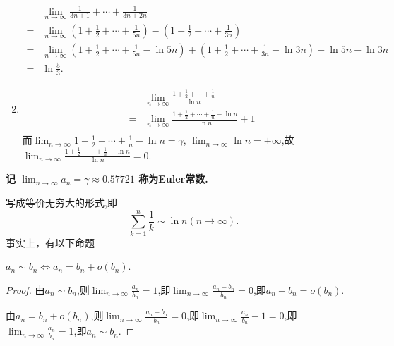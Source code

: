 \begin{example}
\begin{solution}
\begin{enumerate}
                  \begin{align*}
                        & \lim_{n \to \infty} \frac{1}{3n+1} + \cdots + \frac{1}{3n+2n}                                                                                               \\
                      = & \lim_{n \to \infty} \left( 1 + \frac12 + \cdots + \frac1{5n} \right) - \left( 1 + \frac12 + \cdots + \frac1{3n} \right)                                     \\
                      = & \lim_{n \to \infty} \left( 1 + \frac12 + \cdots + \frac1{5n} - \ln 5n \right) + \left( 1 + \frac12 + \cdots + \frac1{3n} - \ln 3n \right) + \ln 5n - \ln 3n \\
                      = & \ln \frac53.
                  \end{align*}
            \item
                  \begin{align*}
                        & \lim_{n \to \infty} \frac{ 1 + \frac12 + \cdots + \frac1n}{\ln n}             \\
                      = & \lim_{n \to \infty} \frac{ 1 + \frac12 + \cdots + \frac1n - \ln n}{\ln n} + 1 \\
                  \end{align*}
                  而$\lim_{n \to \infty} { 1 + \frac12 + \cdots + \frac1n - \ln n} = \gamma$, $\lim_{n \to \infty} \ln n = +\infty$,故$\lim_{n \to \infty} \frac{ 1 + \frac12 + \cdots + \frac1n - \ln n}{\ln n} = 0$.

        \end{enumerate}
    \end{solution}
\end{example}

\textbf{记 $\lim_{n \to \infty} a_n = \gamma \approx 0.57721$ 称为Euler常数.}

写成等价无穷大的形式,即$$\sum_{k=1}^{n} \frac1k \sim \ln n (n \to \infty).$$
事实上，有以下命题
\begin{proposition}
    $a_n \sim b_n \Leftrightarrow a_n = b_n + o(b_n)$.
\end{proposition}

\begin{proof}
    由$a_n \sim b_n$,则$\lim_{n \to \infty} \frac{a_n}{b_n} = 1$,即$\lim_{n \to \infty} \frac{a_n - b_n}{b_n} = 0$,即$a_n - b_n = o(b_n)$.

    由$a_n = b_n + o(b_n)$,则$\lim_{n \to \infty} \frac{a_n - b_n}{b_n} = 0$,即$\lim_{n \to \infty} \frac{a_n}{b_n} - 1 = 0$,即$\lim_{n \to \infty} \frac{a_n}{b_n} = 1$,即$a_n \sim b_n$.
\end{proof}

